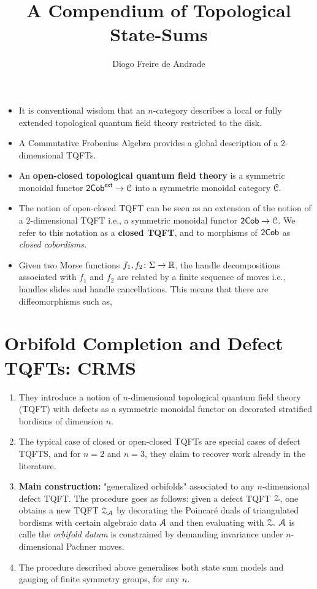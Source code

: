 



\title{A Compendium of Topological State-Sums}
\author{Diogo Freire de Andrade}


\maketitle


\tableofcontents

\begin{itemize}

\item It is conventional wisdom that an $n$-category describes a local or fully extended topological quantum field theory restricted to the disk.

\item A Commutative Frobenius Algebra provides a global description of a 2-dimensional TQFTs.

\item An \textbf{open-closed topological quantum field theory} is a symmetric monoidal functor ${\sf 2Cob}^{{\sf ext}}\rightarrow \mathcal C$ into a symmetric monoidal category $\mathcal C.$
\item The notion of open-closed TQFT can be seen as an extension of the notion of a $2$-dimensional TQFT i.e., a symmetric monoidal functor ${\sf 2Cob}\rightarrow \mathcal C$. We refer to this notation as a \textbf{closed TQFT}, and to morphisms of ${\sf 2Cob}$ as \textit{closed cobordisms.}
\item Given two Morse functions $f_1,f_2\colon \Sigma \rightarrow \mathbb R$, the handle decompositions associated with $f_1$ and $f_2$ are related by a finite sequence of moves i.e., handles slides and handle cancellations. This means that there are diffeomorphisms such as,
\end{itemize}

\section{Orbifold Completion and Defect TQFTs: CRMS }

\begin{enumerate}
    \item They introduce a notion of $n$-dimensional topological quantum field theory (TQFT) with defects as a symmetric monoidal functor on decorated stratified bordisms of dimension $n$. 
    \item The typical case of closed or open-closed TQFTs are special cases of defect TQFTS, and for $n=2$ and $n=3$, they claim to recover work already in the literature.
    \item \textbf{Main construction:} "generalized orbifolds" associated to any $n$-dimensional defect TQFT. The procedure goes as follows: given a defect TQFT $\mathcal Z$, one obtains a new TQFT $\mathcal Z_\mathcal A$ by decorating the Poincaré duals of triangulated bordisms with certain algebraic data $\mathcal A$ and then evaluating with $\mathcal Z.$ $\mathcal A$ is calle the \textit{orbifold datum} is constrained by demanding invariance under $n$-dimensional Pachner moves.
    \item The procedure described above generalises both state sum models and gauging of finite symmetry groups, for any $n.$
\end{enumerate}

